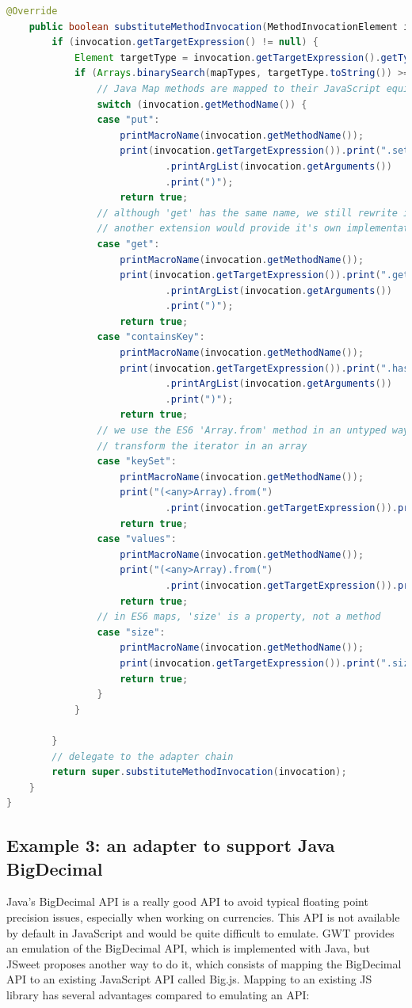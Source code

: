 \documentclass[a4paper]{report}
\begin{document}
\begin{lstlisting}[language=Java]
	@Override
	public boolean substituteMethodInvocation(MethodInvocationElement invocation) {
		if (invocation.getTargetExpression() != null) {
			Element targetType = invocation.getTargetExpression().getTypeAsElement();
			if (Arrays.binarySearch(mapTypes, targetType.toString()) >= 0) {
				// Java Map methods are mapped to their JavaScript equivalent
				switch (invocation.getMethodName()) {
				case "put":
					printMacroName(invocation.getMethodName());
					print(invocation.getTargetExpression()).print(".set(")
							.printArgList(invocation.getArguments())
							.print(")");
					return true;
				// although 'get' has the same name, we still rewrite it in case
				// another extension would provide it's own implementation
				case "get":
					printMacroName(invocation.getMethodName());
					print(invocation.getTargetExpression()).print(".get(")
							.printArgList(invocation.getArguments())
							.print(")");
					return true;
				case "containsKey":
					printMacroName(invocation.getMethodName());
					print(invocation.getTargetExpression()).print(".has(")
							.printArgList(invocation.getArguments())
							.print(")");
					return true;
				// we use the ES6 'Array.from' method in an untyped way to
				// transform the iterator in an array
				case "keySet":
					printMacroName(invocation.getMethodName());
					print("(<any>Array).from(")
							.print(invocation.getTargetExpression()).print(".keys())");
					return true;
				case "values":
					printMacroName(invocation.getMethodName());
					print("(<any>Array).from(")
							.print(invocation.getTargetExpression()).print(".values())");
					return true;
				// in ES6 maps, 'size' is a property, not a method
				case "size":
					printMacroName(invocation.getMethodName());
					print(invocation.getTargetExpression()).print(".size");
					return true;
				}
			}

		}
		// delegate to the adapter chain
		return super.substituteMethodInvocation(invocation);
	}
}
\end{lstlisting}


\subsection{Example 3: an adapter to support Java BigDecimal}

Java's BigDecimal API is a really good API to avoid typical floating point precision issues, especially when working on currencies. This API is not available by default in JavaScript and would be quite difficult to emulate. GWT provides an emulation of the BigDecimal API, which is implemented with Java, but JSweet proposes another way to do it, which consists of mapping the BigDecimal API to an existing JavaScript API called Big.js. Mapping to an existing JS library has several advantages compared to emulating an API:
\end{document}
